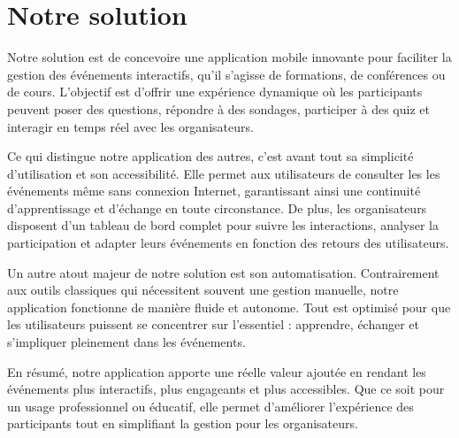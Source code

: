 \section{Notre solution}
Notre solution est de  concevoire une application mobile innovante pour faciliter la gestion des événements interactifs, qu’il s’agisse de formations, de conférences ou de cours. L’objectif est d’offrir une expérience dynamique où les participants peuvent poser des questions, répondre à des sondages, participer à des quiz et interagir en temps réel avec les organisateurs.  

Ce qui distingue notre application des autres, c’est avant tout sa simplicité d’utilisation et son accessibilité. Elle permet aux utilisateurs de consulter les les événements même sans connexion Internet, garantissant ainsi une continuité d’apprentissage et d’échange en toute circonstance. De plus, les organisateurs disposent d’un tableau de bord complet pour suivre les interactions, analyser la participation et adapter leurs événements en fonction des retours des utilisateurs.  

Un autre atout majeur de notre solution est son automatisation. Contrairement aux outils classiques qui nécessitent souvent une gestion manuelle, notre application fonctionne de manière fluide et autonome. Tout est optimisé pour que les utilisateurs puissent se concentrer sur l’essentiel : apprendre, échanger et s’impliquer pleinement dans les événements.  

En résumé, notre application apporte une réelle valeur ajoutée en rendant les événements plus interactifs, plus engageants et plus accessibles. Que ce soit pour un usage professionnel ou éducatif, elle permet d’améliorer l’expérience des participants tout en simplifiant la gestion pour les organisateurs.

